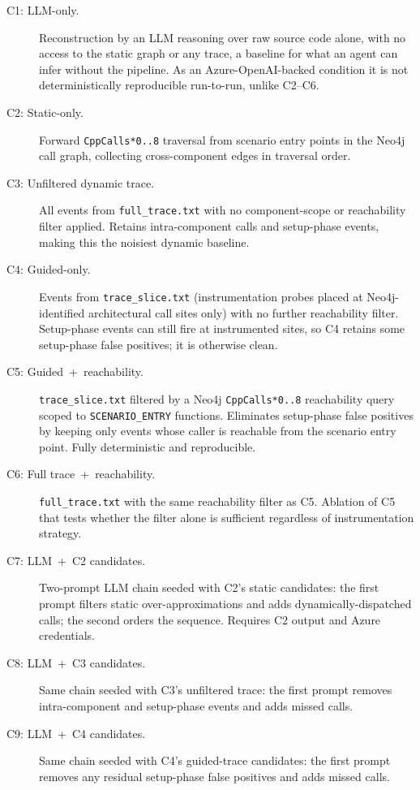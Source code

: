 \begin{description}
  \item[C1: LLM-only.] Reconstruction by an \ac{LLM} reasoning over raw
    source code alone, with no access to the static graph or any trace,
    a baseline for what an agent can infer without the pipeline. As an
    Azure-OpenAI-backed condition it is not deterministically reproducible
    run-to-run, unlike C2--C6.
  \item[C2: Static-only.] Forward \texttt{CppCalls*0..8} traversal from
    scenario entry points in the Neo4j call graph, collecting
    cross-component edges in traversal order.
  \item[C3: Unfiltered dynamic trace.] All events from
    \texttt{full\_trace.txt} with no component-scope or reachability
    filter applied. Retains intra-component calls and setup-phase events,
    making this the noisiest dynamic baseline.
  \item[C4: Guided-only.] Events from \texttt{trace\_slice.txt}
    (instrumentation probes placed at Neo4j-identified architectural call
    sites only) with no further reachability filter. Setup-phase events
    can still fire at instrumented sites, so C4 retains some
    setup-phase false positives; it is otherwise clean.
  \item[C5: Guided~+~reachability.] \texttt{trace\_slice.txt} filtered
    by a Neo4j \texttt{CppCalls*0..8} reachability query scoped to
    \texttt{SCENARIO\_ENTRY} functions. Eliminates setup-phase false
    positives by keeping only events whose caller is reachable from the
    scenario entry point. Fully deterministic and reproducible.
  \item[C6: Full trace~+~reachability.] \texttt{full\_trace.txt} with the
    same reachability filter as C5. Ablation of C5 that tests whether
    the filter alone is sufficient regardless of instrumentation strategy.
  \item[C7: LLM~+~C2 candidates.] Two-prompt \ac{LLM} chain seeded with
    C2's static candidates: the first prompt filters static
    over-approxi\-mations and adds dynamically-dispatched calls; the
    second orders the sequence. Requires C2 output and Azure credentials.
  \item[C8: LLM~+~C3 candidates.] Same chain seeded with C3's
    unfiltered trace: the first prompt removes intra-component and
    setup-phase events and adds missed calls.
  \item[C9: LLM~+~C4 candidates.] Same chain seeded with C4's
    guided-trace candidates: the first prompt removes any residual
    setup-phase false positives and adds missed calls.
\end{description}

